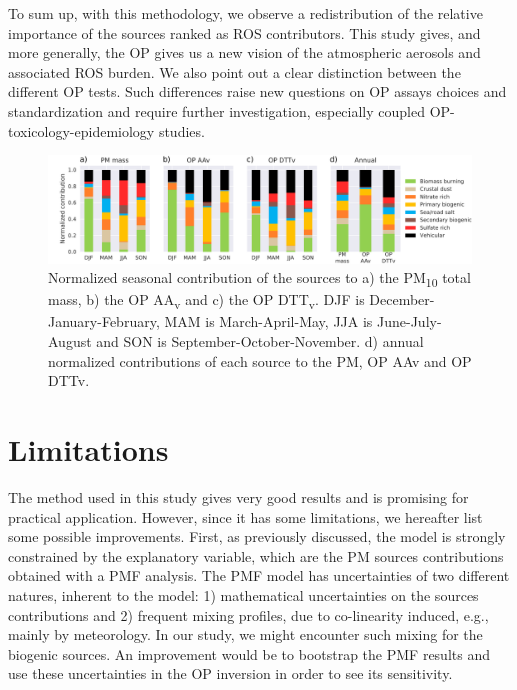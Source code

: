 \documentclass[acp, manuscript]{copernicus}
\begin{document}
To sum up, with this methodology, we observe a redistribution of the relative
importance of the sources ranked as ROS contributors. This study gives, and more
generally, the OP gives us a new vision of the atmospheric aerosols and
associated ROS burden. We also point out a clear distinction between the
different OP tests. Such differences raise new questions on OP assays choices
and standardization and require further investigation, especially coupled
OP-toxicology-epidemiology studies.

\begin{figure}[h]
    \centering
    \includegraphics[width=\textwidth]{figures/fig06}
    \caption{Normalized seasonal contribution of the sources to a) the
    PM\textsubscript{10} total mass, b) the OP AA\textsubscript{v} and c) the OP
    DTT\textsubscript{v}. DJF is December-January-February, MAM is March-April-May,
JJA is June-July-August and SON is September-October-November. d) annual
normalized contributions of each source to the PM, OP AAv and OP DTTv.}
    \label{fig:contributions}
\end{figure}

\section{Limitations}\label{limitations}

The method used in this study gives very good results and is promising for
practical application. However, since it has some limitations, we hereafter list
some possible improvements. First, as previously discussed, the model is
strongly constrained by the explanatory variable, which are the PM sources
contributions obtained with a PMF analysis. The PMF model has uncertainties of
two different natures, inherent to the model: 1) mathematical uncertainties on
the sources contributions and 2) frequent mixing profiles, due to co-linearity
induced, e.g., mainly by meteorology. In our study, we might encounter such
mixing for the biogenic sources. An improvement would be to bootstrap the PMF
results and use these uncertainties in the OP inversion in order to see its
sensitivity.
\end{document}
